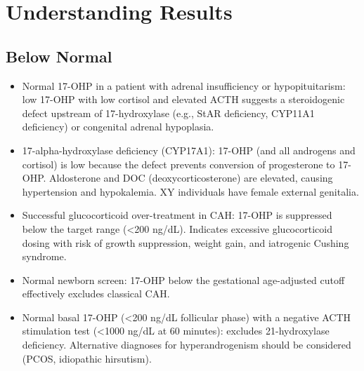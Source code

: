 \section*{Understanding Results}

\subsection*{Below Normal}
\begin{itemize}
  \item Normal 17-OHP in a patient with adrenal insufficiency or hypopituitarism: low 17-OHP with low cortisol and elevated ACTH suggests a steroidogenic defect upstream of 17-hydroxylase (e.g., StAR deficiency, CYP11A1 deficiency) or congenital adrenal hypoplasia.
  \item 17-alpha-hydroxylase deficiency (CYP17A1): 17-OHP (and all androgens and cortisol) is low because the defect prevents conversion of progesterone to 17-OHP. Aldosterone and DOC (deoxycorticosterone) are elevated, causing hypertension and hypokalemia. XY individuals have female external genitalia.
  \item Successful glucocorticoid over-treatment in CAH: 17-OHP is suppressed below the target range (<200 ng/dL). Indicates excessive glucocorticoid dosing with risk of growth suppression, weight gain, and iatrogenic Cushing syndrome.
  \item Normal newborn screen: 17-OHP below the gestational age-adjusted cutoff effectively excludes classical CAH.
  \item Normal basal 17-OHP (<200 ng/dL follicular phase) with a negative ACTH stimulation test (<1000 ng/dL at 60 minutes): excludes 21-hydroxylase deficiency. Alternative diagnoses for hyperandrogenism should be considered (PCOS, idiopathic hirsutism).
\end{itemize}

